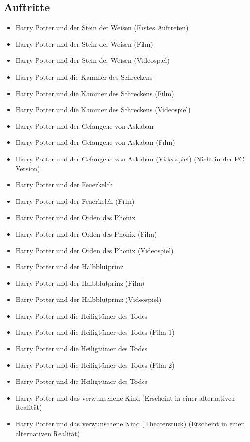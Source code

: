 \documentclass[a4paper, 10pt]{article}
\begin{document}
\subsection*{\Large Auftritte}
\vspace{10pt}
\begin{itemize}
    \item Harry Potter und der Stein der Weisen (Erstes Auftreten)
    \item Harry Potter und der Stein der Weisen (Film)
    \item Harry Potter und der Stein der Weisen (Videospiel)
    \item Harry Potter und die Kammer des Schreckens
    \item Harry Potter und die Kammer des Schreckens (Film)
    \item Harry Potter und die Kammer des Schreckens (Videospiel)
    \item Harry Potter und der Gefangene von Askaban
    \item Harry Potter und der Gefangene von Askaban (Film)
    \item Harry Potter und der Gefangene von Askaban (Videospiel) (Nicht in der PC-Version)
    \item Harry Potter und der Feuerkelch
    \item Harry Potter und der Feuerkelch (Film)
    \item Harry Potter und der Orden des Phönix
    \item Harry Potter und der Orden des Phönix (Film)
    \item Harry Potter und der Orden des Phönix (Videospiel)
    \item Harry Potter und der Halbblutprinz
    \item Harry Potter und der Halbblutprinz (Film)
    \item Harry Potter und der Halbblutprinz (Videospiel)
    \item Harry Potter und die Heiligtümer des Todes
    \item Harry Potter und die Heiligtümer des Todes (Film 1)
    \item Harry Potter und die Heiligtümer des Todes
    \item Harry Potter und die Heiligtümer des Todes (Film 2)
    \item Harry Potter und die Heiligtümer des Todes
    \item Harry Potter und das verwunschene Kind (Erscheint in einer alternativen Realität)
    \item Harry Potter und das verwunschene Kind (Theaterstück) (Erscheint in einer alternativen Realität)

\end{itemize}
\end{document}
